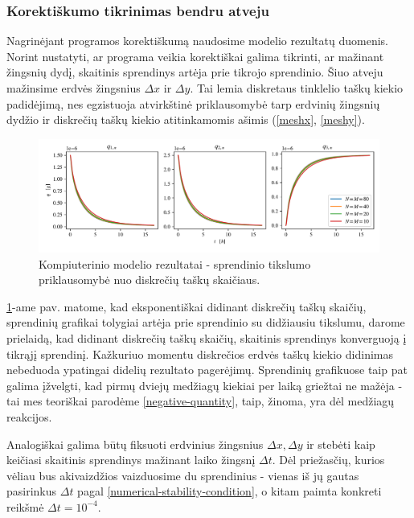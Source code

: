 \subsubsection*{Korektiškumo tikrinimas bendru atveju}

Nagrinėjant programos korektiškumą naudosime modelio rezultatų duomenis. 
Norint nustatyti, ar programa veikia korektiškai galima tikrinti, ar mažinant žingsnių dydį, skaitinis sprendinys artėja prie tikrojo sprendinio. Šiuo atveju mažinsime erdvės žingsnius $\Delta x$ ir $\Delta y$. Tai lemia diskretaus tinklelio taškų kiekio padidėjimą, nes egzistuoja atvirkštinė priklausomybė tarp erdvinių žingsnių dydžio ir diskrečių taškų kiekio atitinkamomis ašimis (\ref{meshx}, \ref{meshy}).

\newpage

\begin{figure}[h!]
    \centering
    \includegraphics[width=\textwidth]{../assets/space-error-v3.png}

    \caption{Kompiuterinio modelio rezultatai - sprendinio tikslumo priklausomybė nuo diskrečių taškų skaičiaus. }

    \label{results-space-error}
\end{figure}

\ref{results-space-error}-ame pav. matome, kad eksponentiškai didinant diskrečių taškų skaičių, sprendinių grafikai tolygiai artėja prie sprendinio su didžiausiu tikslumu, darome prielaidą, kad didinant diskrečių taškų skaičių, skaitinis sprendinys konverguoją į tikrąjį sprendinį. Kažkuriuo momentu diskrečios erdvės taškų kiekio didinimas nebeduoda ypatingai didelių rezultato pagerėjimų. Sprendinių grafikuose taip pat galima įžvelgti, kad pirmų dviejų medžiagų kiekiai per laiką griežtai ne mažėja - tai mes teoriškai parodėme \eqref{negative-quantity}, taip, žinoma, yra dėl  medžiagų reakcijos. 

Analogiškai galima būtų fiksuoti erdvinius žingsnius $\Delta x, \Delta y$ ir stebėti kaip keičiasi skaitinis sprendinys mažinant laiko žingsnį $\Delta t$. Dėl priežasčių, kurios vėliau bus akivaizdžios vaizduosime du sprendinius - vienas iš jų gautas pasirinkus $\Delta t$ pagal \eqref{numerical-stability-condition}, o kitam paimta konkreti reikšmė $\Delta t = 10^{-4}$.


